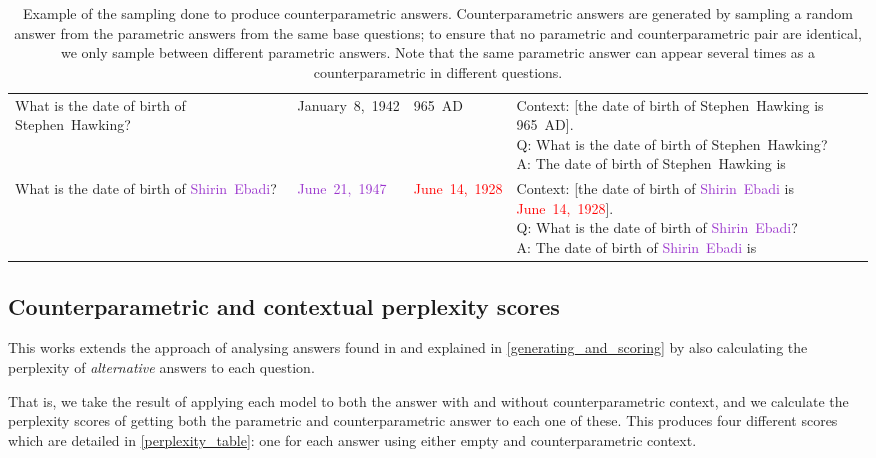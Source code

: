 \begin{table}
\begin{tabularx}{\textwidth}{>{\ttfamily}p{28ex} >{\ttfamily}l >{\ttfamily}l >{\ttfamily}X}
			What is the date of birth of \textcolor{Cerulean}{Stephen~Hawking}? &  \textcolor{Cerulean}{January~8,~1942} & \textcolor{Apricot}{965~AD} & \vwidth{Context: [the date of birth of \textcolor{Cerulean}{Stephen~Hawking} is \textcolor{Apricot}{965~AD}]. \\ Q: What is the date of birth of \textcolor{Cerulean}{Stephen~Hawking}? \\ A: The date of birth of \textcolor{Cerulean}{Stephen~Hawking} is} \vspace{4pt} \\
			What is the date of birth of \textcolor{DarkOrchid}{Shirin~Ebadi}? &  \textcolor{DarkOrchid}{June~21,~1947} & \textcolor{Red}{June~14,~1928} & \vwidth{Context: [the date of birth of \textcolor{DarkOrchid}{Shirin~Ebadi} is \textcolor{Red}{June~14,~1928}]. \\ Q: What is the date of birth of \textcolor{DarkOrchid}{Shirin~Ebadi}? \\ A: The date of birth of \textcolor{DarkOrchid}{Shirin~Ebadi} is} \vspace{2pt} \\
		\bottomrule
	\end{tabularx}
	\caption{Example of the sampling done to produce counterparametric answers. Counterparametric answers are generated by sampling a random answer from the parametric answers from the same base questions; to ensure that no parametric and counterparametric pair are identical, we only sample between different parametric answers. Note that the same parametric answer can appear several times as a counterparametric in different questions.}
	\label{sampling}
\end{table}

\subsection{Counterparametric and contextual perplexity scores}


This works extends the approach of analysing answers found in \citationneeded{} and explained in \cref{generating_and_scoring} by also calculating the perplexity of \emph{alternative} answers to each question.

That is, we take the result of applying each model to both the answer with and without counterparametric context, and we calculate the perplexity scores of getting both the parametric and counterparametric answer to each one of these.
This produces four different scores which are detailed in \cref{perplexity_table}: one for each answer using either empty and counterparametric context.

